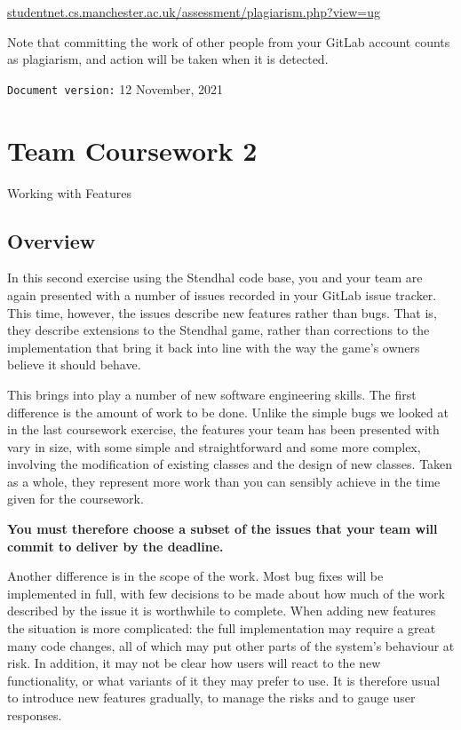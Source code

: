 \documentclass[
]{book}
\begin{document}
\href{http://studentnet.cs.manchester.ac.uk/assessment/plagiarism.php?view=ug}{studentnet.cs.manchester.ac.uk/assessment/plagiarism.php?view=ug}

Note that committing the work of other people from your GitLab account counts as plagiarism, and action will be taken when it is detected.

\texttt{Document\ version:} 12 November, 2021

\hypertarget{working}{%
\chapter{Team Coursework 2}\label{working}}

Working with Features

\hypertarget{ovirew}{%
\section{Overview}\label{ovirew}}

In this second exercise using the Stendhal code base, you and your team are again presented with a number of issues recorded in your GitLab issue tracker. This time, however, the issues describe new features rather than bugs. That is, they describe extensions to the Stendhal game, rather than corrections to the implementation that bring it back into line with the way the game's owners believe it should behave.

This brings into play a number of new software engineering skills. The first difference is the amount of work to be done. Unlike the simple bugs we looked at in the last coursework exercise, the features your team has been presented with vary in size, with some simple and straightforward and some more complex, involving the modification of existing classes and the design of new classes. Taken as a whole, they represent more work than you can sensibly achieve in the time given for the coursework.

\textbf{You must therefore choose a subset of the issues that your team will commit to deliver by the deadline.}

Another difference is in the scope of the work. Most bug fixes will be implemented in full, with few decisions to be made about how much of the work described by the issue it is worthwhile to complete. When adding new features the situation is more complicated: the full implementation may require a great many code changes, all of which may put other parts of the system's behaviour at risk. In addition, it may not be clear how users will react to the new functionality, or what variants of it they may prefer to use. It is therefore usual to introduce new features gradually, to manage the risks and to gauge user responses.
\end{document}
